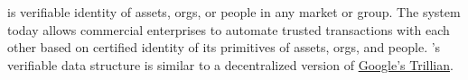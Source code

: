 \LayerTwoLong{} is verifiable identity of assets, orgs, or people in any market
or group. The system today allows commercial enterprises to automate
trusted transactions with each other based on certified identity of its
primitives of assets, orgs, and people.
\LayerTwoLong{}'s verifiable data structure is similar to a decentralized
version of
\href{https://github.com/google/trillian/blob/master/docs/papers/VerifiableDataStructures.pdf}{Google's Trillian}.
